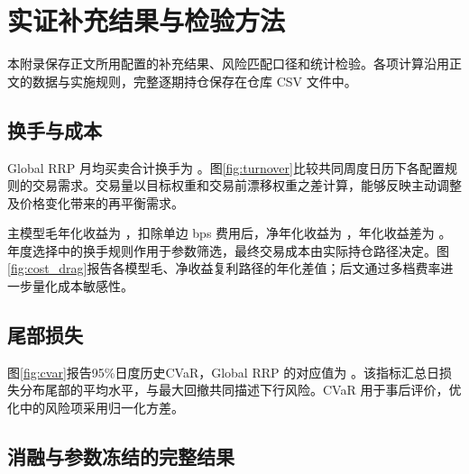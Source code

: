 \section{实证补充结果与检验方法}
\label{app:empirical}
本附录保存正文所用配置的补充结果、风险匹配口径和统计检验。各项计算沿用正文的数据与实施规则，完整逐期持仓保存在仓库 CSV 文件中。
\subsection{换手与成本}
Global RRP 月均买卖合计换手为 \globalMonthlyTurnover。图\ref{fig:turnover}比较共同周度日历下各配置规则的交易需求。交易量以目标权重和交易前漂移权重之差计算，能够反映主动调整及价格变化带来的再平衡需求。


主模型毛年化收益为 \globalGrossReturn，扣除单边 \txCostBps{} bps 费用后，净年化收益为 \globalNetReturn，年化收益差为 \globalCostDrag。年度选择中的换手规则作用于参数筛选，最终交易成本由实际持仓路径决定。图\ref{fig:cost_drag}报告各模型毛、净收益复利路径的年化差值；后文通过多档费率进一步量化成本敏感性。

\FloatBarrier

\subsection{尾部损失}
图\ref{fig:cvar}报告95\%日度历史CVaR，Global RRP 的对应值为 \globalCVaR。该指标汇总日损失分布尾部的平均水平，与最大回撤共同描述下行风险。CVaR 用于事后评价，优化中的风险项采用归一化方差。


\subsection{消融与参数冻结的完整结果}
\begin{table}[htbp]\centering
\caption{目标项消融与参数冻结的完整比较}\label{tab:ablation_full}
\fitthesistable{}
\end{table}
\begin{table}[htbp]\centering
\caption{资本跟踪与风险贡献偏离}\label{tab:diagnostic_mechanism}
\fitthesistable{}
\end{table}

